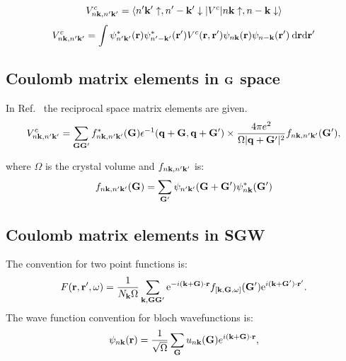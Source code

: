 %
\begin{equation}
V^{c}_{n{\bf k},n'{\bf k}'} = \langle n'{\bf k}'\uparrow, n'-{\bf k}'\downarrow |V^{c}| n{\bf k}\uparrow, 
n-{\bf k}\downarrow\rangle
\end{equation}
%
\begin{equation}
V^{c}_{n{\bf k},n'{\bf k}'} = \int \psi^{*}_{n'{\bf k}'}({\bf r})\psi^{*}_{n'-{\bf k}'}({\bf r}') V^{c}({\bf r},{\bf r}')
\psi_{n{\bf k}}({\bf r})\psi_{n-{\bf k}}({\bf r}')\:\rm{d}{\bf r}\mathrm{d}{\bf r}'
\end{equation}
%

\subsection{Coulomb matrix elements in ${\bf G}$ space}
In Ref.~\cite{cohen95} the reciprocal space matrix elements are given.
%
\begin{equation}
\label{eq:cohen1}
V^{c}_{n{\bf k},n'{\bf k}'} = \sum_{{\bf G}{\bf G}'}f^{*}_{n{\bf k},n'{\bf k}'}({\bf G})\epsilon^{-1}({\bf q}+{\bf G},{\bf q}+{\bf G}')
\times \frac{4\pi e^{2}}{\Omega|{\bf q}+{\bf G}'|^{2}}f_{n{\bf k},n'{\bf k}'}({\bf G}'),
\end{equation}

where $\Omega$ is the crystal volume and $f_{n{\bf k},n'{\bf k}'}$ is:
%
\begin{equation}
\label{eq:cohen2}
f_{n{\bf k},n'{\bf k}'}({\bf G}) = \sum_{{\bf G}'} \psi_{n'{\bf k}'}({\bf G}+{\bf G}')\psi^{*}_{n{\bf k}}({\bf G}')
\end{equation}
%

\subsection{Coulomb matrix elements in SGW}
The convention for two point functions is:
%
\begin{equation}\label{eq.fourier}
 F({\bf r},{\bf r}',\omega) = \frac{1}{N_{\bf k}\Omega}  \sum_{{\bf k},{\bf G}{\bf G}'} 
  {\rm e}^{-i({\bf k}+{\bf G})\cdot{\bf r}} 
  f_{[{\bf k},{\bf G},\omega]}({\bf G}')
  {\rm e}^{i({\bf k}+{\bf G}')\cdot{\bf r}'}.
\end{equation}
%
The wave function convention for bloch wavefunctions is:
%
\begin{equation}
\psi_{n{\bf k}}({\bf r}) = \frac{1}{\sqrt{\Omega}}\sum_{{\bf G}}u_{n{\bf k}}({\bf G})e^{i({\bf k}+{\bf G})\cdot{\bf r}},
\end{equation}

